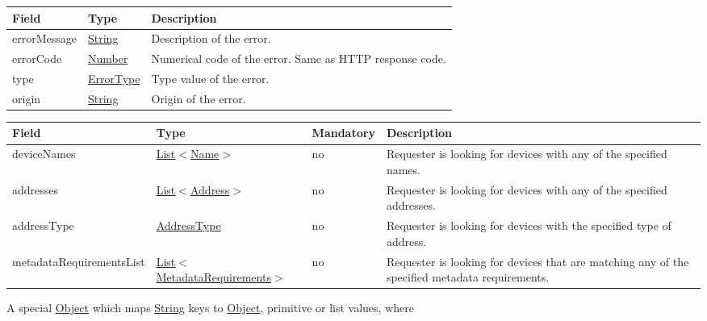 \documentclass[a4paper]{arrowhead}
\newcommand{\pref}[1]{{\textcolor{ArrowheadGrey}{\hyperref[sec:model:primitives:#1]{#1}}}}
\begin{document}

\begin{table}[ht!]
\begin{tabularx}{\textwidth}{| p{4.25cm} | p{3.5cm} | X |} \hline
\rowcolor{gray!33} Field & Type      & Description \\ \hline
errorMessage & \pref{String} & Description of the error. \\ \hline
errorCode &\pref{Number}  & Numerical code of the error. Same as HTTP response code.\\ \hline
type & \pref{ErrorType} & Type value of the error.\\ \hline
origin & \pref{String} & Origin of the error. \\ \hline
\end{tabularx}
\end{table}


\begin{table}[ht!]
\begin{tabularx}{\textwidth}{| p{4.2cm} | p{4.8cm} | p{2cm} | X |} \hline
\rowcolor{gray!33} Field & Type & Mandatory & Description \\ \hline
deviceNames &  \pref{List}$<$\pref{Name}$>$ & no & Requester is looking for devices with any of the specified names. \\ \hline
addresses &  \pref{List}$<$\pref{Address}$>$ & no & Requester is looking for devices with any of the specified add\-resses.   \\ \hline
addressType &  \pref{AddressType} & no & Requester is looking for devices with the specified type of address. \\ \hline
metadataRequirementsList & \pref{List}$<$\hyperref[sec:model:MetadataRequirements]{MetadataRequirements}$>$ & no & Requester is looking for devices that are matching any of the spe\-cified metadata requirements. \\ \hline
\end{tabularx}
\end{table}


A special \pref{Object} which maps \pref{String} keys to \pref{Object}, primitive or list values, where 
\end{document}
